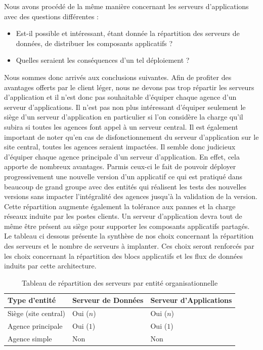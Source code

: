 Nous avons procédé de la même manière concernant les serveurs d'applications avec des questions différentes :\\
\begin{itemize}
	\item[\textbullet] Est-il possible et intéressant, étant donnée la répartition des serveurs de données, de distribuer les composants applicatifs ?
	\item[\textbullet] Quelles seraient les conséquences d'un tel déploiement ?\\
\end{itemize}

Nous sommes donc arrivés aux conclusions suivantes. Afin de profiter des avantages offerts par le client léger, nous ne devons pas trop répartir les serveurs d'application et il n'est donc pas souhaitable d'équiper chaque agence d'un serveur d'applications. Il n'est pas non plus intéressant d'équiper seulement le siège d'un serveur d'application en particulier si l'on considère la charge qu'il subira si toutes les agences font appel à un serveur central. Il est également important de noter qu'en cas de disfonctionnement du serveur d'application sur le site central, toutes les agences seraient impactées. Il semble donc judicieux d'équiper chaque agence principale d'un serveur d'application. En effet, cela apporte de nombreux avantages. Parmis ceux-ci le fait de pouvoir déployer progressivement une nouvelle version d'un applicatif ce qui est pratiqué dans beaucoup de grand groupe avec des entités qui réalisent les tests des nouvelles versions sans impacter l'intégralité des agences jusqu'à la validation de la version. Cette répartition augmente également la tolérance aux pannes et la charge réseaux induite par les postes clients. Un serveur d'application devra tout de même être présent au siège pour supporter les composants applicatifs partagés.\\

Le tableau ci dessous présente la synthèse de nos choix concernant la répartition des serveurs et le nombre de serveurs à implanter. Ces choix seront renforcés par les choix concernant la répartition des blocs applicatifs et les flux de données induits par cette architecture. 


\begin{table}[H]
    \centering
    \begin{tabular}{l|l|l}
    Type d'entité        & Serveur de Données & Serveur d'Applications \\ \hline
    Siège (site central) & Oui ($n$)            & Oui ($n$)                \\
    Agence principale    & Oui ($1$)            & Oui ($1$)                \\
    Agence simple        & Non                & Non                    \\
    \end{tabular}
    \caption{Tableau de répartition des serveurs par entité organisationnelle}
\end{table}

